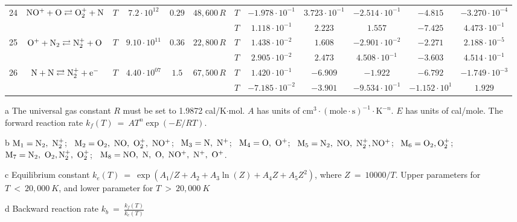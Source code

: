 \documentclass{warpdoc}
\begin{document}
\begin{table}[!ht]
\begin{center}
\begin{threeparttable}
\begin{tabular}{cccccccccccc}
                                          
24 & $\rm NO^+ + O \rightleftarrows O_2^+ + N$ &$T$ & $7.2 \cdot 10^{12}$ & $0.29$ & $48,600\, R$ 
                                          &$T$  & $-1.978 \cdot 10^{-1}$  & $3.723 \cdot 10^{-1}$  & $-2.514 \cdot 10^{-1}$ & $-4.815$ & $-3.270 \cdot 10^{-4}$\\
 & & & & &                                &$T$  & $1.118 \cdot 10^{-1}$  & $2.223$  & $1.557$ & $-7.425$ & $4.473 \cdot 10^{-1}$\\
 
                                          
25 & $\rm O^+ + N_2 \rightleftarrows N_2^+ + O$ &$T$ & $9.10 \cdot 10^{11}$ & $0.36$ & $22,800\, R$ 
                                          &$T$  & $1.438 \cdot 10^{-2}$  & $1.608$  & $-2.901 \cdot 10^{-2}$ & $-2.271$ & $2.188 \cdot 10^{-5}$\\
 & & & & &                                &$T$  & $2.905 \cdot 10^{-2}$  & $2.473$  & $4.508 \cdot 10^{-1}$ & $-3.603$ & $4.514 \cdot 10^{-1}$\\
 
                                                                                    
26 & $\rm N + N \rightleftarrows N_2^{+} + e^{-}$ &$T$ & $4.40 \cdot 10^{07}$ & $1.5$ & $67,500\, R$ 
                                          &$T$  & $1.420 \cdot 10^{-1}$  & $-6.909$  & $-1.922$ & $-6.792$ & $-1.749 \cdot 10^{-3}$\\
 & & & & &                                &$T$  & $-7.185 \cdot 10^{-2}$  & $-3.901$  & $-9.534 \cdot 10^{-1}$ & $-1.152 \cdot 10^{1}$ & $1.929$\\
\bottomrule
\end{tabular}
\begin{tablenotes}
\item[{a}] The universal gas constant $R$ must be set to 1.9872	cal/K$\cdot$mol. $A$ has units of $\textrm{cm}^3\cdot(\textrm{mole}\cdot \textrm{s})^{-1}\cdot \textrm{K}^{-n}$. $E$ has units of cal/mole. The forward reaction rate $k_f(T) ~= ~A T^n \exp(-E/RT).$
\item[{b}] $\rm M_1=N_2,~N_2^+$;~ $\rm M_2=O_2,~NO,~O_2^+,~NO^+$;~ $\rm M_3=N,~N^+$;~ $\rm M_4=O,~O^+$; ~$\rm M_5=N_2,~NO,~N_2^+,NO^+$; ~$\rm M_6=O_2, O_2^+$; ~$\rm M_7=N_2,~O_2,N_2^+,~O_2^+$;~ $\rm M_8=NO,~N,~O,~NO^+,~N^+,~O^+$.
\item[{c}] Equilibrium constant $k_e(T) ~= ~\exp(A_1/Z + A_2 + A_3 \ln(Z) + A_4Z +A_5 Z^2)$, where $Z ~= ~10000/T $. Upper parameters for $T~<~20,000 ~K$, and lower parameter for $T~>~20,000 ~K$
\item[{d}] Backward reaction rate $k_b ~= ~\frac{k_f(T)}{k_e(T)}$
\end{tablenotes}
\label{tab:kim2021a}
\end{threeparttable}
\end{center}
\end{table}
% 
\end{document}
